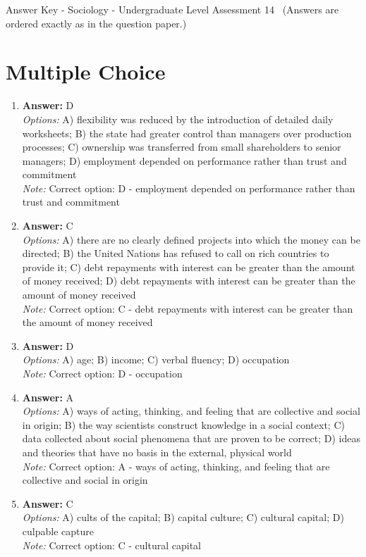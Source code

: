 \documentclass[12pt]{article}
\begin{document}
\begin{center}
Answer Key - Sociology - Undergraduate Level Assessment 14 \
\small (Answers are ordered exactly as in the question paper.)
\end{center}

\section*{Multiple Choice}
\begin{enumerate}[label=\arabic*.]
\item \textbf{Answer:} D
\\ \textit{Options:} A) flexibility was reduced by the introduction of detailed daily worksheets; B) the state had greater control than managers over production processes; C) ownership was transferred from small shareholders to senior managers; D) employment depended on performance rather than trust and commitment
\\ \textit{Note:} Correct option: D - employment depended on performance rather than trust and commitment
\item \textbf{Answer:} C
\\ \textit{Options:} A) there are no clearly defined projects into which the money can be directed; B) the United Nations has refused to call on rich countries to provide it; C) debt repayments with interest can be greater than the amount of money received; D) debt repayments with interest can be greater than the amount of money received
\\ \textit{Note:} Correct option: C - debt repayments with interest can be greater than the amount of money received
\item \textbf{Answer:} D
\\ \textit{Options:} A) age; B) income; C) verbal fluency; D) occupation
\\ \textit{Note:} Correct option: D - occupation
\item \textbf{Answer:} A
\\ \textit{Options:} A) ways of acting, thinking, and feeling that are collective and social in origin; B) the way scientists construct knowledge in a social context; C) data collected about social phenomena that are proven to be correct; D) ideas and theories that have no basis in the external, physical world
\\ \textit{Note:} Correct option: A - ways of acting, thinking, and feeling that are collective and social in origin
\item \textbf{Answer:} C
\\ \textit{Options:} A) cults of the capital; B) capital culture; C) cultural capital; D) culpable capture
\\ \textit{Note:} Correct option: C - cultural capital
\end{enumerate}
\end{document}

